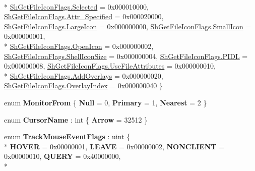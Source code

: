 \begin{DoxyCompactItemize}
\\*
\hyperlink{namespace_open_t_k_1_1_platform_1_1_windows_a515477a6b134fd1e396a53beb66b9f88a91b442d385b54e1418d81adc34871053}{Sh\-Get\-File\-Icon\-Flags.\-Selected} = 0x000010000, 
\hyperlink{namespace_open_t_k_1_1_platform_1_1_windows_a515477a6b134fd1e396a53beb66b9f88adcedfbbf9e366a750df8772bfbbe22b7}{Sh\-Get\-File\-Icon\-Flags.\-Attr\-\_\-\-Specified} = 0x000020000, 
\hyperlink{namespace_open_t_k_1_1_platform_1_1_windows_a515477a6b134fd1e396a53beb66b9f88a08f7728d14d36f52bd6d413d9c963e7c}{Sh\-Get\-File\-Icon\-Flags.\-Large\-Icon} = 0x000000000, 
\hyperlink{namespace_open_t_k_1_1_platform_1_1_windows_a515477a6b134fd1e396a53beb66b9f88af10923216bc690081c9c9e2ce32d66ae}{Sh\-Get\-File\-Icon\-Flags.\-Small\-Icon} = 0x000000001, 
\\*
\hyperlink{namespace_open_t_k_1_1_platform_1_1_windows_a515477a6b134fd1e396a53beb66b9f88aa01037cba4230c2b8da0f03454ba002e}{Sh\-Get\-File\-Icon\-Flags.\-Open\-Icon} = 0x000000002, 
\hyperlink{namespace_open_t_k_1_1_platform_1_1_windows_a515477a6b134fd1e396a53beb66b9f88a8afaa9e9ea20194a3ca276c263b94241}{Sh\-Get\-File\-Icon\-Flags.\-Shell\-Icon\-Size} = 0x000000004, 
\hyperlink{namespace_open_t_k_1_1_platform_1_1_windows_a515477a6b134fd1e396a53beb66b9f88a605534a578c2ea820de4a155e1ec542f}{Sh\-Get\-File\-Icon\-Flags.\-P\-I\-D\-L} = 0x000000008, 
\hyperlink{namespace_open_t_k_1_1_platform_1_1_windows_a515477a6b134fd1e396a53beb66b9f88a973ca7fddbacaaa1810be24d088446c9}{Sh\-Get\-File\-Icon\-Flags.\-Use\-File\-Attributes} = 0x000000010, 
\\*
\hyperlink{namespace_open_t_k_1_1_platform_1_1_windows_a515477a6b134fd1e396a53beb66b9f88af4fe4d5d06259cb6ab0fea9d18a7c304}{Sh\-Get\-File\-Icon\-Flags.\-Add\-Overlays} = 0x000000020, 
\hyperlink{namespace_open_t_k_1_1_platform_1_1_windows_a515477a6b134fd1e396a53beb66b9f88a84aed79d022df97af71a911a474b89e7}{Sh\-Get\-File\-Icon\-Flags.\-Overlay\-Index} = 0x000000040
 \}
\item 
enum {\bfseries Monitor\-From} \{ {\bfseries Null} = 0, 
{\bfseries Primary} = 1, 
{\bfseries Nearest} = 2
 \}
\item 
enum {\bfseries Cursor\-Name} \-: int \{ {\bfseries Arrow} = 32512
 \}
\item 
enum {\bfseries Track\-Mouse\-Event\-Flags} \-: uint \{ \\*
{\bfseries H\-O\-V\-E\-R} = 0x00000001, 
{\bfseries L\-E\-A\-V\-E} = 0x00000002, 
{\bfseries N\-O\-N\-C\-L\-I\-E\-N\-T} = 0x00000010, 
{\bfseries Q\-U\-E\-R\-Y} = 0x40000000, 
\\*

\end{DoxyCompactItemize}
